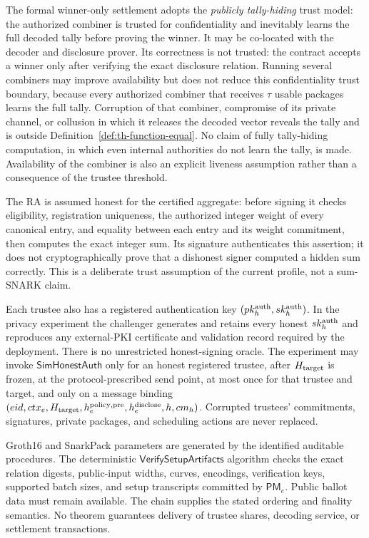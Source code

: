 \documentclass[pdflatex,sn-mathphys-num]{sn-jnl}%
\theoremstyle{thmstyleone}%
\theoremstyle{thmstyletwo}%
\theoremstyle{thmstylethree}%
\begin{document}
The formal winner-only settlement adopts the \emph{publicly tally-hiding} trust model:
the authorized combiner is trusted for confidentiality and inevitably learns
the full decoded tally before proving the winner.  It may be co-located with
the decoder and disclosure prover.  Its correctness is not trusted: the
contract accepts a winner only after verifying the exact disclosure relation.
Running several combiners may improve availability but does not reduce this
confidentiality trust boundary, because every authorized combiner that receives
$\tau$ usable packages learns the full tally.  Corruption of that combiner, compromise of
its private channel, or collusion in which it releases the decoded vector
reveals the tally and is outside Definition~\ref{def:th-function-equal}.  No
claim of fully tally-hiding computation, in which even internal authorities do
not learn the tally, is made.  Availability of the combiner is also an
explicit liveness assumption rather than a consequence of the trustee
threshold.

The RA is assumed honest for the certified aggregate: before signing it checks
eligibility, registration uniqueness, the authorized integer weight of every
canonical entry, and equality between each entry and its weight commitment,
then computes the exact integer sum.  Its signature authenticates this
assertion; it does not cryptographically prove that a dishonest signer computed
a hidden sum correctly.  This is a deliberate trust assumption of the current
profile, not a sum-SNARK claim.

Each trustee also has a registered authentication key
$(pk_h^{\rm auth},sk_h^{\rm auth})$.  In the privacy experiment the challenger
generates and retains every honest $sk_h^{\rm auth}$ and reproduces any
external-PKI certificate and validation record required by the deployment.
There is no unrestricted honest-signing oracle.  The experiment may invoke
$\mathsf{SimHonestAuth}$ only for an honest registered trustee, after
$H_{\rm target}$ is frozen, at the protocol-prescribed send point, at most once
for that trustee and target, and only on a message binding
$(eid,ctx_e,H_{\rm target},h_e^{\rm policy,pre},h_e^{\rm disclose},h,cm_h)$.
Corrupted trustees' commitments,
signatures, private packages, and scheduling actions are never replaced.

Groth16 and SnarkPack parameters are generated by the identified auditable
procedures.  The deterministic $\mathsf{VerifySetupArtifacts}$ algorithm checks
the exact relation digests, public-input widths, curves, encodings, verification
keys, supported batch sizes, and setup transcripts committed by
$\mathsf{PM}_e$.  Public ballot data must remain available.  The chain supplies
the stated ordering and finality semantics.  No theorem guarantees delivery of
trustee shares, decoding service, or settlement transactions.
\end{document}
